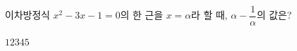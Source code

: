 이차방정식 $x^2-3x-1=0$의 한 근을 $x=\alpha$라 할 때, $\alpha-\dfrac{1}{\alpha}$의 값은?
\begin{choices32}{$1$}{$2$}{$3$}{$4$}{$5$}\end{choices32}
